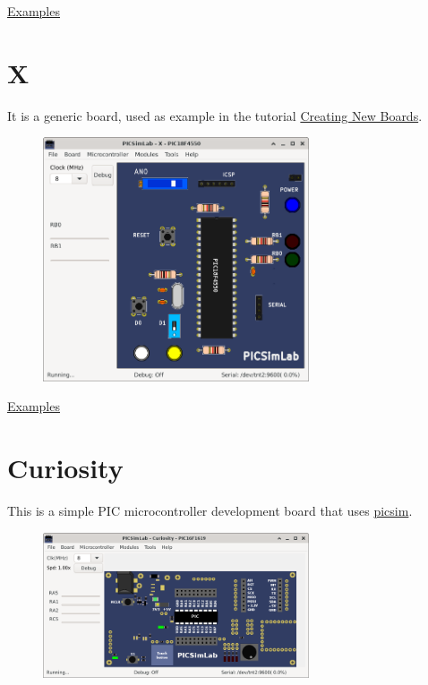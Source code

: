 \href{https://lcgamboa.github.io/picsimlab_examples/board_STM32_H103.html}{Examples}


\section{X}

It is a generic board, used as example in the tutorial 
\href{https://lcgamboa.github.io/picsimlab_docs/stable/CreatingNewBoards.html}{Creating New Boards}.

\begin{figure}[H]
\center
\includegraphics[width=0.7\textwidth]{img/X.png} 
\end{figure} 

\href{https://lcgamboa.github.io/picsimlab_examples/board_X.html}{Examples}

\section{Curiosity }

This is a simple PIC microcontroller development board that uses \href{https://github.com/lcgamboa/picsim}{picsim}.

\begin{figure}[H]
\center
\includegraphics[width=0.7\textwidth]{img/Curiosity.png} 
\end{figure} 

